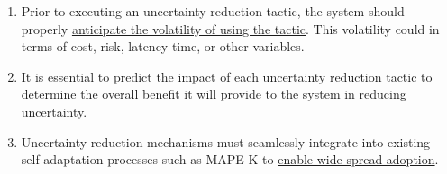 \documentclass[12pt]{article}
\begin{document}
\begin{enumerate}[noitemsep]

	

	\item Prior to executing an uncertainty reduction tactic, the system should properly \ul{anticipate the volatility of using the tactic}. This volatility could in terms of  cost, risk, latency time, or other variables. 

	\item It is essential to \ul{predict the impact} of each uncertainty reduction tactic to determine the overall benefit it will provide to the system in reducing uncertainty. %
	

    \item Uncertainty reduction mechanisms must seamlessly integrate into existing self-adaptation processes such as MAPE-K to \ul{enable wide-spread adoption}.

\end{enumerate}
\end{document}
